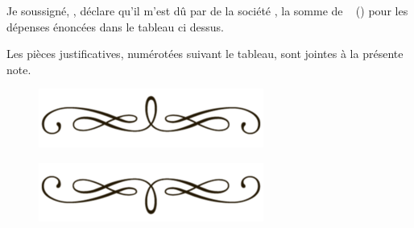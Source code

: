 \documentclass[a4paper,10pt]{article}
\begin{document}
Je soussigné, \rsprenomNomCreancier{}, déclare qu'il m'est dû par \rsciviliteClient{}\rsprenomNomClient{} de la société \rssocieteClient{}, la somme de \rstotalEnChiffres{}~\rsuniteMonetaire{} (\rstotalEnLettres{}) pour les dépenses énoncées dans le tableau ci dessus.




\vspace{\rsespaceVertical}



Les pièces justificatives, numérotées suivant le tableau, sont jointes à la présente note.




\rsCredit{}


\begin{figure}[t]
\begin{center}
\includegraphics[scale=0.3]{line_haut.png}
\end{center}
\end{figure}


\begin{figure}[b]
\begin{center}
\includegraphics[scale=0.3]{line_bas.png}
\end{center}
\end{figure}
\end{document}
